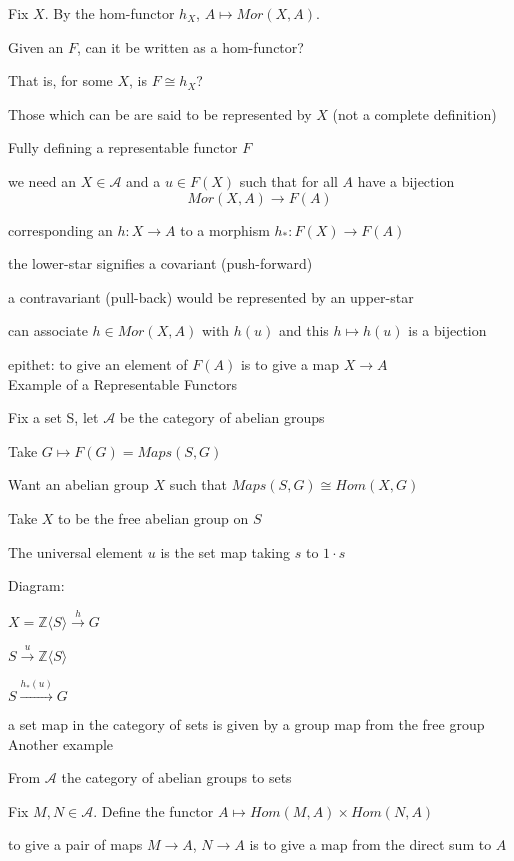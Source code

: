 \documentclass[12pt]{article}
\begin{document}
Fix $X$.  By the hom-functor $h_X$, $A \mapsto Mor(X, A)$.

Given an $F$, can it be written as a hom-functor?

That is, for some $X$, is $F \cong h_X$?

Those which can be are said to be represented by $X$ (not a complete definition)

\noindent
Fully defining a representable functor $F$

we need an $X \in \mathcal{A}$ and a $u \in F(X)$ such that for all $A$ have a bijection $$Mor(X, A) \to F(A)$$

corresponding an $h: X \to A$ to a morphism $h_*: F(X) \to F(A)$

the lower-star signifies a covariant (push-forward)

a contravariant (pull-back) would be represented by an upper-star

can associate $h \in Mor(X, A)$ with $h(u)$ and this $h \mapsto h(u)$ is a bijection

epithet: to give an element of $F(A)$ is to give a map $X \to A$\\

\noindent
Example of a Representable Functors

Fix a set S, let $\mathcal{A}$ be the category of abelian groups

Take $G \mapsto F(G) = Maps(S, G)$

Want an abelian group $X$ such that $Maps(S, G) \cong Hom(X, G)$

Take $X$ to be the free abelian group on $S$

The universal element $u$ is the set map taking $s$ to $1 \cdot s$

\noindent
Diagram:

$X = \mathds{Z}\langle S \rangle \xrightarrow{h} G$

$S \xrightarrow{u} \mathds{Z}\langle S \rangle$

$S \xrightarrow{h_*(u)} G$

\noindent
a set map in the category of sets is given by a group map from the free group\\

\noindent
Another example

From $\mathcal{A}$ the category of abelian groups to sets

Fix $M, N \in \mathcal{A}$.  Define the functor $A \mapsto Hom(M, A) \times Hom(N, A)$

to give a pair of maps $M \to A$, $N \to A$ is to give a map from the direct sum to $A$
\end{document}
